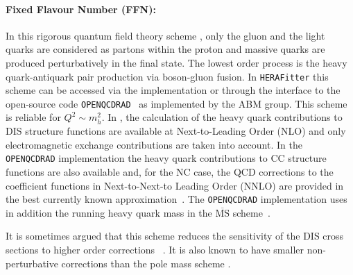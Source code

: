 \paragraph{Fixed Flavour Number (FFN)\rm:\\} 
In this rigorous quantum field theory scheme \cite{Laenen:1992, Laenen:1993, Riem:1995}, 
only the gluon and the light quarks are considered
as partons within the proton and massive 
quarks are produced perturbatively in the final state.
The lowest order process is
the heavy quark-antiquark pair production via boson-gluon fusion.
In \texttt{HERA}\texttt{Fitter} this scheme can be accessed via the 
\qcdnum implementation or through the interface to the open-source code \texttt{OPENQCDRAD}~\cite{openqcdrad:page} as implemented by the ABM group.
This scheme is reliable for $Q^2 \sim m_h^2$.
In \qcdnum, the calculation of the heavy quark contributions to DIS structure functions
are available at Next-to-Leading Order (NLO) and only electromagnetic exchange contributions are taken into account. 
In the \texttt{OPEN}\texttt{QCDRAD} implementation the heavy quark contributions to CC structure functions are also available 
and, for the NC case, the QCD corrections to the coefficient functions in Next-to-Next-to Leading Order (NNLO)
are provided in the best currently known approximation~\cite{SMoch:npb864}.
The  \texttt{OPENQCDRAD} implementation uses in addition the running heavy quark mass in the $\overline{\text{MS}}$ scheme~\cite{Alekhin:runm}.

It is sometimes argued that this scheme reduces the sensitivity of the DIS cross sections to higher order corrections ~\cite{SMoch:npb864}. It is also known to have smaller non-perturbative corrections than the pole mass scheme 
\cite{Beneke:1998ui}.


